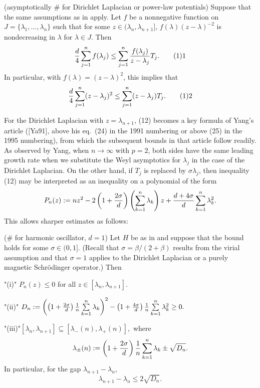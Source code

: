 (asymptotically \# for Dirichlet Laplacian or power-law potentials)  Suppose 
that the same assumptions as in  apply.  
Let $f$ be a nonnegative 
function on $J = \{\lambda_1, ..., \lambda_n\}$ such that for some 
$z \in 
(\lambda_n,\lambda_{n+1}]$,  $f(\lambda)(z- \lambda)^{-2}$ is 
nondecreasing in $\lambda$ for $\lambda \in J$.  Then
$${d \over 4} \sum\limits_{j=1}^{n} f(\lambda 
_j)\le\sum\limits_{j = 1}^{n} {f(\lambda_j) \over 
z -\lambda_j}T_j.
\tag11$$
In particular, with $f(\lambda) = (z-\lambda)^2$, this implies that
$$
{d \over 4} \sum\limits_{j =1}^{n} (z -\lambda 
_j)^{2}\le \sum\limits_{j= 1}^{n} 
(z -\lambda_j)T_j. \tag 12$$
\endproclaim

For the Dirichlet Laplacian with $z = \lambda_{n+1}$, 
(12) becomes a key 
formula of Yang's article ([Ya91], above his eq.\ (24) 
in the 1991 numbering 
or above (25) in the 1995 numbering), from which the subsequent bounds in that 
article follow readily.  As observed by Yang, 
when $n \rightarrow \infty$ 
 with $p=2$, both sides have the same 
 leading growth rate when we substitute 
the Weyl asymptotics for $\lambda_j$ in the case of the Dirichlet 
Laplacian.  On the other hand, if $T_j$ is replaced by $\sigma 
\lambda_j$, then inequality (12) may be interpreted as an inequality on 
a polynomial of the form 
$$
P_n(z) := nz^2- 2\left(1+{2\sigma  \over 
d}\right)\left(\sum\limits_{k=1}^{n} \lambda_k\right) 
z + {d+4\sigma  \over d}\sum\limits_{k = 1}^{n} \lambda_k^2.$$
This allows sharper estimates as follows:
\endremark

 (\# for harmonic oscillator, $d=1$)
Let $H$ be as in  and suppose that the bound 
 holds for some  
$\sigma\in (0,1]$.  
(Recall that $\sigma = \beta/(2+\beta)$ results from the 
virial assumption  and that $\sigma=1$ 
applies to the Dirichlet Laplacian 
or a purely magnetic Schr\"odinger operator.)  Then 
\roster
\item"(i)" $P_n(z)  \le  0$ for all  $z \in [\lambda_n, \lambda_{n+1}]$.
\item"(ii)"
$D_n:= \left(\left(1+{2\sigma  \over d}\right){1 \over 
n}\sum\limits_{k=1}^{n} \lambda_k\right)^{2} - 
\left(1+{4\sigma  \over d}\right){1 \over n}\sum\limits_{k = 1}^{n} 
\lambda_k^2 \ge 0.$
\item"(iii)"$[\lambda_n, \lambda_{n+1}]\subseteq 
[\lambda_-(n),\lambda_+(n)], $
where 
$$\lambda_\pm(n) := \left(1+{2\sigma  \over d}\right) 
{1 \over n}\sum\limits_{k = 1}^{n} \lambda_k\pm  
\sqrt {D_n}.$$
In particular, for the gap $\lambda_{n+1}  - \lambda_{n}$, 
$$
\lambda_{n+1} - \lambda_n\le  2\sqrt {D_n}.$$
\endroster
\endproclaim

